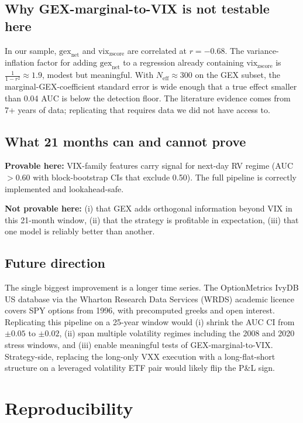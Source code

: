 \documentclass[11pt,a4paper]{article}
\begin{document}
\subsection{Why GEX-marginal-to-VIX is not testable here}

In our sample, $\text{gex}_{\text{net}}$ and $\text{vix}_{\text{zscore}}$ are correlated at $r = -0.68$. The variance-inflation factor for adding $\text{gex}_{\text{net}}$ to a regression already containing $\text{vix}_{\text{zscore}}$ is $\frac{1}{1 - r^2} \approx 1.9$, modest but meaningful. With $N_{\text{eff}} \approx 300$ on the GEX subset, the marginal-GEX-coefficient standard error is wide enough that a true effect smaller than 0.04 AUC is below the detection floor. The literature evidence \cite{barbon2021dealer} comes from 7+ years of data; replicating that requires data we did not have access to.

\subsection{What 21 months can and cannot prove}

\textbf{Provable here:} VIX-family features carry signal for next-day RV regime (AUC $> 0.60$ with block-bootstrap CIs that exclude 0.50). The full pipeline is correctly implemented and lookahead-safe.

\textbf{Not provable here:} (i) that GEX adds orthogonal information beyond VIX in this 21-month window, (ii) that the strategy is profitable in expectation, (iii) that one model is reliably better than another.

\subsection{Future direction}

The single biggest improvement is a longer time series. The OptionMetrics IvyDB US database via the Wharton Research Data Services (WRDS) academic licence covers SPY options from 1996, with precomputed greeks and open interest. Replicating this pipeline on a 25-year window would (i) shrink the AUC CI from $\pm 0.05$ to $\pm 0.02$, (ii) span multiple volatility regimes including the 2008 and 2020 stress windows, and (iii) enable meaningful tests of GEX-marginal-to-VIX. Strategy-side, replacing the long-only VXX execution with a long-flat-short structure on a leveraged volatility ETF pair would likely flip the P\&L sign.

\section{Reproducibility}
\end{document}
